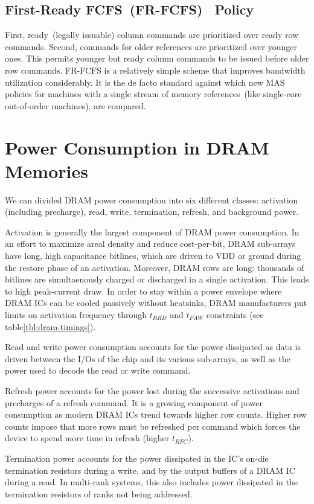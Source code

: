 \subsection{First-Ready FCFS~(FR-FCFS)~\cite{frfcfs} Policy}\label{sec:frfcfs}
First, ready~(legally issuable) column commands are prioritized over ready row
commands. Second, commands for older references are prioritized over younger
ones. This permits younger but ready column commands to be issued before older
row commands. FR-FCFS is a relatively simple scheme that improves bandwidth
utilization considerably. It is the de facto standard against which new MAS
policies for machines with a single stream of memory references~(like
single-core out-of-order machines), are compared.

\section{Power Consumption in DRAM Memories}\label{sec:dram-power}

We can divided DRAM power consumption into six different classes: activation
(including precharge), read, write, termination, refresh, and background power.

Activation is generally the largest component of DRAM power consumption.  In an
effort to maximize areal density and reduce cost-per-bit, DRAM sub-arrays have
long, high capacitance bitlines, which are driven to VDD or ground during the
restore phase of an activation. Moreover, DRAM rows are long: thousands of
bitlines are simultaenously charged or discharged in a single activation. This
leads to high peak-current draw. In order to stay within a power envelope where
DRAM ICs can be cooled passively without heatsinks, DRAM manufacturers put
limits on activation frequency through $t_{RRD}$ and $t_{FAW}$ constraints (see
table\ref{tbl:dram-timings}).

Read and write power consumption accounts for the power dissipated as data is
driven between the I/Os of the chip and its various sub-arrays, as well as the
power used to decode the read or write command.

Refresh power accounts for the power lost during the successive activations and
precharges of a refresh command. It is a growing component of power consumption
as modern DRAM ICs trend towards higher row counts. Higher row counts impose
that more rows must be refreshed per command which forces the device to spend
more time in refresh (higher $t_{RFC}$).

Termination power accounts for the power dissipated in the IC's on-die
termination resistors during a write, and by the output buffers of a DRAM IC
during a read. In multi-rank systems, this also includes power dissipated in
the termination resistors of ranks not being addressed.

